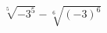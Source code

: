 \begin{ex}[type=calculate]
	\begin{condition}
		\( \sqrt[5]{-3^5}-\sqrt[6]{(-3)^6} \)
	\end{condition}
\end{ex}